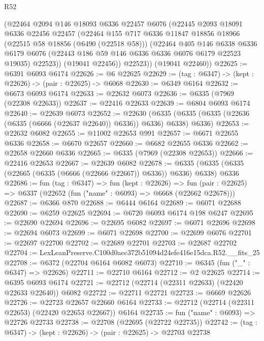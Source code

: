 \begin{lexlean}{R52}
\begin{coremodule}
        (@22464
          @2094
          @146
          @18093
          @6336
          @22457
          @6076
          (@22445
            @2093
            @18091
            @6336
            @22456
            @22457
            (@22464
              @155
              @717
              @6336
              @11847
              @18856
              @18966
              (@22515 @58 @18856 (@6490 (@22518 @58)))
              (@22464
                @405
                @146
                @6338
                @6336
                @6179
                @6076
                (@22443 @186 @59 @146 @6336 @6336 @6076 @6179 @22523 @19035)
                @22523))
            (@19041 @22456))
          @22523))
      (@19041 @22460))
@22625 := @6391 @6093 @6174
@22626 := @6 @22625
@22629 := (tag : @6347) -> (kept : @22626) -> (pair : @22625) -> @6068
@22630 := @6349 @6164
@22632 := @6673 @6093 @6174
@22633 := @22632 @6073
@22636 := @6335 (@7969 (@22308 @22633))
@22637 := @22416 @22633
@22639 := @6804 @6093 @6174
@22640 := @22639 @6073
@22652 := @22630
    (@6335 (@6335 (@6335 (@22636 (@6335 (@6666 (@22637 @22640)) @6336)) @6336) @6338) @6336)
@22653 := @22632 @6082
@22655 := @11002 @22653 @991
@22657 := @6671 @22655 @6336
@22658 := @6670 @22657
@22660 := @6682 @22655 @6336
@22662 := @22658 @22660 @6336
@22665 := @6335 (@7969 (@22308 @22653))
@22666 := @22416 @22653
@22667 := @22639 @6082
@22678 := @6335 (@6335 (@6335 (@22665 (@6335 (@6666 (@22666 @22667)) @6336)) @6336) @6338) @6336
@22686 := fun (tag : @6347) =>
  fun (kept : @22626) =>
  fun (pair : @22625) => @6337 (@22652 (fun ("name" : @6093) => @6668 (@22662 @22678)))
@22687 := @6366 @870
@22688 := @6444 @6164
@22689 := @6071 @22688
@22690 := @6259 @22625
@22694 := @6720 @6093 @6174 @198 @6247
@22695 := @22690 @22694
@22696 := @22695 @6082
@22697 := @6071 @22696
@22698 := @22694 @6073
@22699 := @6071 @22698
@22700 := @22699 @6076
@22701 := @22697 @22700
@22702 := @22689 @22701
@22703 := @22687 @22702
@22704 := LexLeanPreserve.C100d0aec372b51094d24efe416e15dca.R52.__fits_25
@22708 := @6372 (@22704 @6164 @6082 @6073)
@22710 := @6345 (fun ("_" : @6347) => @22626)
@22711 := @22710 @6164
@22712 := @2 @22625
@22714 := @6395 @6093 @6174
@22721 := @22712 (@22714 (@22311 @22633) (@22420 @22633 @22640)) @6082
@22722 := @22711 @22721
@22723 := @6669 @22626
@22726 := @22723 @22657 @22660 @6164
@22733 := @22712 (@22714 (@22311 @22653) (@22420 @22653 @22667)) @6164
@22735 := fun ("name" : @6093) => @22726 @22733
@22738 := @22708 (@22695 (@22722 @22735))
@22742 := (tag : @6347) -> (kept : @22626) -> (pair : @22625) -> @22703 @22738

\end{coremodule}
\end{lexlean}
